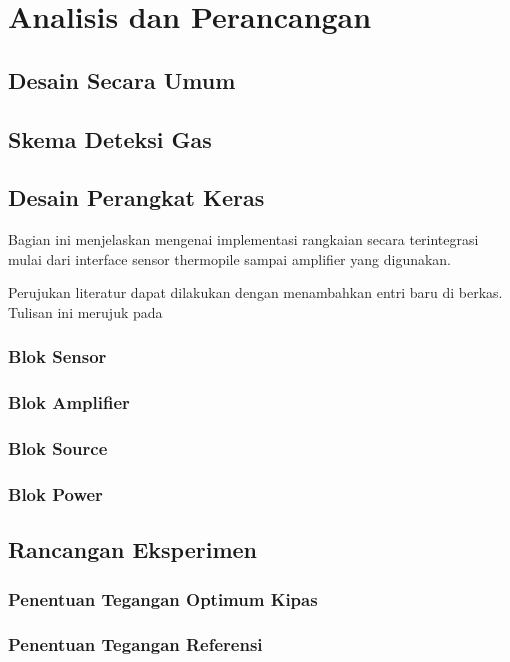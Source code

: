 \chapter{Analisis dan Perancangan}
	\section{Desain Secara Umum}
			
	\section{Skema Deteksi Gas}
		
	\section{Desain Perangkat Keras}
	Bagian ini menjelaskan mengenai implementasi rangkaian secara terintegrasi mulai dari interface sensor thermopile sampai amplifier yang digunakan.

	Perujukan literatur dapat dilakukan dengan menambahkan entri baru di berkas. Tulisan ini merujuk pada \parencite{knuth2001art}
		
	\subsection{Blok Sensor}
		
	\subsection{Blok Amplifier}
			
	\subsection{Blok Source}
			
	\subsection{Blok Power}
			
	\section{Rancangan Eksperimen}
		
	\subsection{Penentuan Tegangan Optimum Kipas}
		
	\subsection{Penentuan Tegangan Referensi}